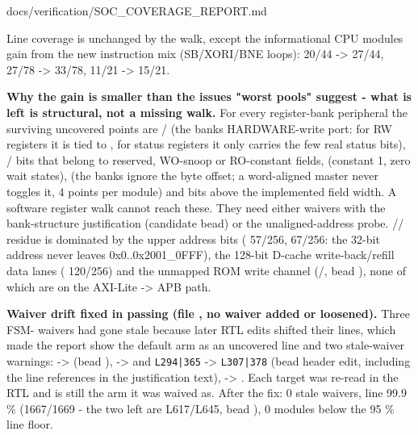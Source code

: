 \begin{relocated}{docs/verification/SOC_COVERAGE_REPORT.md}
{}

Line coverage is unchanged by the walk, except the informational CPU
modules gain from the new instruction mix
(SB/\allowbreak{}XORI/\allowbreak{}BNE loops): 
20/44 -\textgreater{} 27/44,  27/78 -\textgreater{}
33/78,  11/21 -\textgreater{} 15/21.

\textbf{Why the gain is smaller than the issue\textquotesingle s "worst
pools" suggest - what is left is structural, not a missing walk.} For
every register-bank peripheral the surviving uncovered points are
 /  (the bank\textquotesingle s
HARDWARE-write port: for RW registers it is tied to , for
status registers it only carries the few real status bits),
 /  bits that belong to reserved, WO-snoop or
RO-constant fields,  (constant 1, zero wait states),
 (the banks ignore the byte offset; a word-aligned
master never toggles it, 4 points per module) and  bits
above the implemented field width. A software register walk cannot reach
these. They need either waivers with the bank-structure justification
(candidate bead) or the unaligned-address probe.
// residue is dominated
by the upper address bits ( 57/256, 
67/256: the 32-bit address never leaves 0x0..0x2001\_\allowbreak{}0FFF),
the 128-bit D-cache write-back/\allowbreak{}refill data lanes
( 120/256) and the unmapped ROM write channel
(/, bead ), none of which are on
the AXI-Lite -\textgreater{} APB path.

\textbf{Waiver drift fixed in passing (file
, no waiver added or loosened).}
Three FSM- waivers had gone stale because later RTL edits
shifted their lines, which made the report show the default arm as an
uncovered line and two stale-waiver warnings: 
 -\textgreater{}  (bead ), 
 -\textgreater{}  and \texttt{L294|365}
-\textgreater{} \texttt{L307|378} (bead  header edit,
including the  line references in the justification text),
  -\textgreater{} .
Each target was re-read in the RTL and is still the  arm
it was waived as. After the fix: 0 stale waivers, line 99.9 \%
(1667/\allowbreak{}1669 - the two left are 
L617/\allowbreak{}L645, bead ), 0 modules below the 95 \%
line floor.


\end{relocated}
